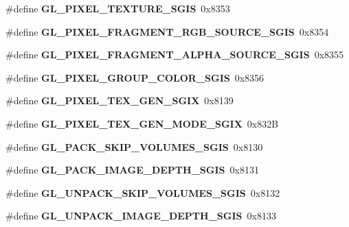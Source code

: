 \begin{DoxyCompactItemize}
\item 
\#define {\bfseries G\+L\+\_\+\+P\+I\+X\+E\+L\+\_\+\+T\+E\+X\+T\+U\+R\+E\+\_\+\+S\+G\+I\+S}~0x8353\label{_s_d_l__opengl_8h_a9882267c7af823dbc5031ab477400cbe}

\item 
\#define {\bfseries G\+L\+\_\+\+P\+I\+X\+E\+L\+\_\+\+F\+R\+A\+G\+M\+E\+N\+T\+\_\+\+R\+G\+B\+\_\+\+S\+O\+U\+R\+C\+E\+\_\+\+S\+G\+I\+S}~0x8354\label{_s_d_l__opengl_8h_ab0ca3f2a8690cacc9b453214fb0f43a9}

\item 
\#define {\bfseries G\+L\+\_\+\+P\+I\+X\+E\+L\+\_\+\+F\+R\+A\+G\+M\+E\+N\+T\+\_\+\+A\+L\+P\+H\+A\+\_\+\+S\+O\+U\+R\+C\+E\+\_\+\+S\+G\+I\+S}~0x8355\label{_s_d_l__opengl_8h_a03f3b3cbb9aa70607f3296851f1dd343}

\item 
\#define {\bfseries G\+L\+\_\+\+P\+I\+X\+E\+L\+\_\+\+G\+R\+O\+U\+P\+\_\+\+C\+O\+L\+O\+R\+\_\+\+S\+G\+I\+S}~0x8356\label{_s_d_l__opengl_8h_af79d5b32c5354cc320c6fef90d0cc064}

\item 
\#define {\bfseries G\+L\+\_\+\+P\+I\+X\+E\+L\+\_\+\+T\+E\+X\+\_\+\+G\+E\+N\+\_\+\+S\+G\+I\+X}~0x8139\label{_s_d_l__opengl_8h_af9af0faa7e774943e2bc036fe20f18a5}

\item 
\#define {\bfseries G\+L\+\_\+\+P\+I\+X\+E\+L\+\_\+\+T\+E\+X\+\_\+\+G\+E\+N\+\_\+\+M\+O\+D\+E\+\_\+\+S\+G\+I\+X}~0x832\+B\label{_s_d_l__opengl_8h_ad9f3082667416676188d4abc78454519}

\item 
\#define {\bfseries G\+L\+\_\+\+P\+A\+C\+K\+\_\+\+S\+K\+I\+P\+\_\+\+V\+O\+L\+U\+M\+E\+S\+\_\+\+S\+G\+I\+S}~0x8130\label{_s_d_l__opengl_8h_a1af713f3fd5d45eb710c4740a807e000}

\item 
\#define {\bfseries G\+L\+\_\+\+P\+A\+C\+K\+\_\+\+I\+M\+A\+G\+E\+\_\+\+D\+E\+P\+T\+H\+\_\+\+S\+G\+I\+S}~0x8131\label{_s_d_l__opengl_8h_a9742be2da813563a2e10fda033e8838f}

\item 
\#define {\bfseries G\+L\+\_\+\+U\+N\+P\+A\+C\+K\+\_\+\+S\+K\+I\+P\+\_\+\+V\+O\+L\+U\+M\+E\+S\+\_\+\+S\+G\+I\+S}~0x8132\label{_s_d_l__opengl_8h_a824f0321b62de8184e69bad6ad814184}

\item 
\#define {\bfseries G\+L\+\_\+\+U\+N\+P\+A\+C\+K\+\_\+\+I\+M\+A\+G\+E\+\_\+\+D\+E\+P\+T\+H\+\_\+\+S\+G\+I\+S}~0x8133\label{_s_d_l__opengl_8h_aa0d7fd1b09a3aac4a7f6a3f20590a6ee}


\end{DoxyCompactItemize}
